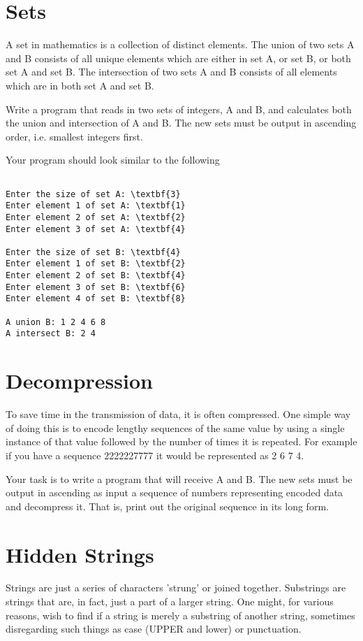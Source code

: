 \documentclass[a4paper,11pt]{article}
\begin{document}
\section{Sets}

A set in mathematics is a collection of distinct elements. The union of two sets A and B consists of all unique elements which are either in set A, or set B, or both set A and set B. The intersection of two sets A and B consists of all elements which are in both set A and set B.

Write a program that reads in two sets of integers, A and B, and calculates both the union and intersection of A and B. The new sets must be output in ascending order, i.e. smallest integers first.

Your program should look similar to the following
\begin{lstlisting}

Enter the size of set A: \textbf{3}
Enter element 1 of set A: \textbf{1}
Enter element 2 of set A: \textbf{2}
Enter element 3 of set A: \textbf{4}

Enter the size of set B: \textbf{4}
Enter element 1 of set B: \textbf{2}
Enter element 2 of set B: \textbf{4}
Enter element 3 of set B: \textbf{6}
Enter element 4 of set B: \textbf{8}

A union B: 1 2 4 6 8
A intersect B: 2 4
\end{lstlisting}

\section{Decompression}

To save time in the transmission of data, it is often compressed. One simple way of doing this is to encode lengthy sequences of the same value by using a single instance of that value followed by the number of times it is repeated. For example if you have a sequence 2222227777 it would be represented as 2 6 7 4.

Your task is to write a program that will receive  A and B. The new sets must be output in ascending as input a sequence of numbers representing encoded data and decompress it. That is, print out the original sequence in its long form.

\section{Hidden Strings}

Strings are just a series of characters 'strung' or joined together. Substrings are strings that are, in fact, just a part of a larger string. One might, for various reasons, wish to find if a string is merely a substring of another string, sometimes disregarding such things as case (UPPER and lower) or punctuation.
\end{document}
